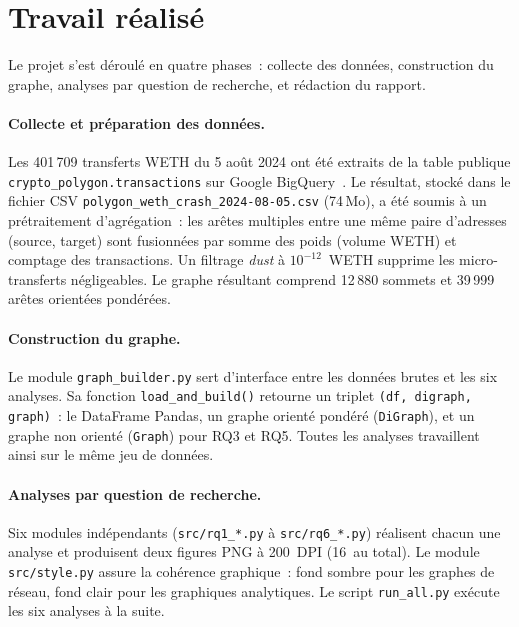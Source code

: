 
\section{Travail r\'ealis\'e}
\label{sec:travail_realise}

Le projet s'est d\'eroul\'e en quatre phases~: collecte des donn\'ees,
construction du graphe, analyses par question de recherche, et r\'edaction
du rapport.

\paragraph{Collecte et pr\'eparation des donn\'ees.}
Les 401\,709 transferts WETH du 5 ao\^ut 2024 ont \'et\'e extraits de la
table publique \texttt{crypto\_polygon.transactions} sur Google
BigQuery~\cite{bigquery_public}. Le r\'esultat, stock\'e dans le fichier
CSV \texttt{polygon\_weth\_crash\_2024-08-05.csv} (74\,Mo), a \'et\'e soumis
\`a un pr\'etraitement d'agr\'egation~: les ar\^etes multiples entre une m\^eme
paire d'adresses (source, target) sont fusionn\'ees par somme des poids
(volume WETH) et comptage des transactions. Un filtrage
\textit{dust} \`a $10^{-12}$~WETH supprime les micro-transferts n\'egligeables.
Le graphe r\'esultant comprend 12\,880 sommets et 39\,999 ar\^etes orient\'ees
pond\'er\'ees.

\paragraph{Construction du graphe.}
Le module \texttt{graph\_builder.py} sert d'interface entre les donn\'ees
brutes et les six analyses. Sa fonction \texttt{load\_and\_build()} retourne
un triplet \texttt{(df, digraph, graph)}~: le DataFrame Pandas, un graphe
orient\'e pond\'er\'e (\texttt{DiGraph}), et un graphe non orient\'e
(\texttt{Graph}) pour RQ3 et RQ5. Toutes les analyses travaillent ainsi sur
le m\^eme jeu de donn\'ees.

\paragraph{Analyses par question de recherche.}
Six modules ind\'ependants (\texttt{src/rq1\_*.py} \`a \texttt{src/rq6\_*.py})
r\'ealisent chacun une analyse et produisent deux figures PNG \`a 200~DPI
(16~au total). Le module \texttt{src/style.py} assure la coh\'erence
graphique~: fond sombre pour les graphes de r\'eseau, fond clair pour les
graphiques analytiques. Le script \texttt{run\_all.py} ex\'ecute les six
analyses \`a la suite.

